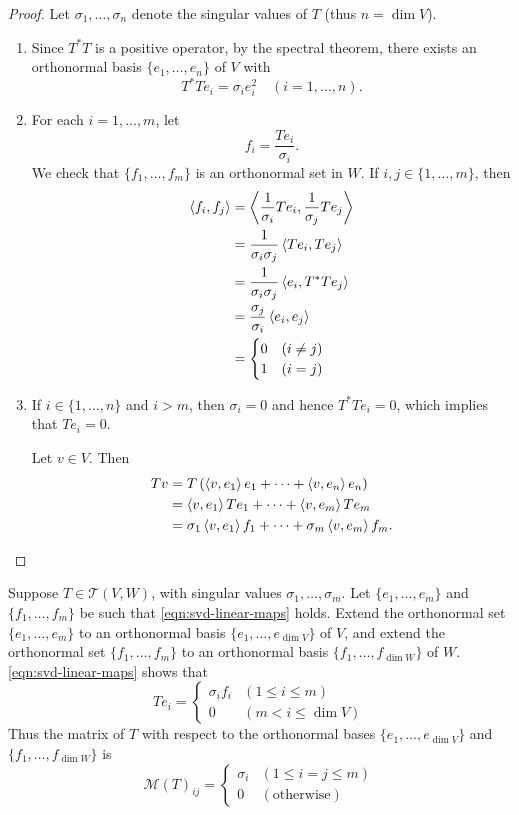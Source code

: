\begin{proof}
Let $\sigma_1,\dots,\sigma_n$ denote the singular values of $T$ (thus $n=\dim V$). 
\begin{enumerate}
\item Since $T^*T$ is a positive operator, by the spectral theorem, there exists an orthonormal basis $\{e_1,\dots,e_n\}$ of $V$ with
\[T^*Te_i=\sigma_ie_i^2\quad(i=1,\dots,n).\]
\item For each $i=1,\dots,m$, let
\[f_i=\frac{Te_i}{\sigma_i}.\]
We check that $\{f_1,\dots,f_m\}$ is an orthonormal set in $W$. If $i,j\in\{1,\dots,m\}$, then
\begin{align*}
\left\langle f_i,f_j\right\rangle
&=\left\langle\frac{1}{\sigma_i}Te_i,\frac{1}{\sigma_j}Te_j\right\rangle\\
&=\frac{1}{\sigma_i\sigma_j}\left\langle Te_i,Te_j\right\rangle\\
&=\frac{1}{\sigma_i\sigma_j}\left\langle e_i,T^*Te_j\right\rangle\\
&=\frac{\sigma_j}{\sigma_i}\left\langle e_i,e_j\right\rangle\\
&=\begin{cases}
0&(i\neq j)\\
1&(i=j)
\end{cases}
\end{align*}

\item If $i\in\{1,\dots,n\}$ and $i>m$, then $\sigma_i=0$ and hence $T^*Te_i=0$, which implies that $Te_i=0$.

Let $v\in V$. Then
\begin{align*}
Tv&=T\left(\left\langle v,e_1\right\rangle e_1+\cdots+\left\langle v,e_n\right\rangle e_n\right)\\
&=\left\langle v,e_1\right\rangle Te_1+\cdots+\left\langle v,e_m\right\rangle Te_m\\
&=\sigma_1\left\langle v,e_1\right\rangle f_1+\cdots+\sigma_m\left\langle v,e_m\right\rangle f_m.
\end{align*}
\end{enumerate}
\end{proof}

Suppose $T\in\mathcal{T}(V,W)$, with singular values $\sigma_1,\dots,\sigma_m$. Let $\{e_1,\dots,e_m\}$ and $\{f_1,\dots,f_m\}$ be such that \eqref{eqn:svd-linear-maps} holds. 
Extend the orthonormal set $\{e_1,\dots,e_m\}$ to an orthonormal basis $\{e_1,\dots,e_{\dim V}\}$ of $V$, and extend the orthonormal set $\{f_1,\dots,f_m\}$ to an orthonormal basis $\{f_1,\dots,f_{\dim W}\}$ of $W$. 
\eqref{eqn:svd-linear-maps} shows that
\[Te_i=\begin{cases}
\sigma_if_i&(1\le i\le m)\\
0&(m<i\le\dim V)
\end{cases}\]
Thus the matrix of $T$ with respect to the orthonormal bases $\{e_1,\dots,e_{\dim V}\}$ and $\{f_1,\dots,f_{\dim W}\}$ is
\[\mathcal{M}(T)_{ij}=\begin{cases}
\sigma_i&(1\le i=j\le m)\\
0&(\text{otherwise})
\end{cases}\]

